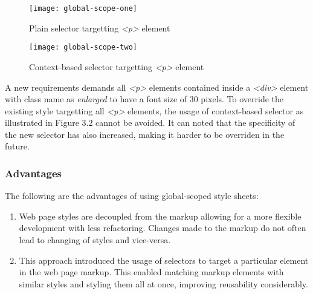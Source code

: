 \documentclass[12pt]{article}
\begin{document}
\vspace{0.5cm}

\begin{figure}[h]
\texttt{[image: global-scope-one]}
\centering
\caption{Plain selector targetting \textit{<p>} element}
\end{figure}

\vspace{0.5cm}

\begin{figure}[h]
\texttt{[image: global-scope-two]}
\centering
\caption{Context-based selector targetting \textit{<p>} element}
\end{figure}

\vspace{0.5cm}

A new requirements demands all \textit{<p>} elements contained inside a \textit{<div>} element with class name as \textit{enlarged} to have a font size of 30 pixels. To override the existing style targetting all \textit{<p>} elements, the usage of  context-based selector as illustrated in Figure 3.2 cannot be avoided. It can noted that the specificity of the new selector has also increased, making it harder to be overriden in the future. 


\subsubsection{Advantages}
The following are the advantages of using global-scoped style sheets:
\begin{enumerate}
	\item Web page styles are decoupled from the markup allowing for a more flexible development with less refactoring. Changes made to the markup do not often lead to changing of styles and vice-versa.

	\item This approach introduced the usage of selectors to target a particular element in the web page markup. This enabled matching markup elements with similar styles and styling them all at once, improving reusability considerably.
\end{enumerate} 
\end{document}
